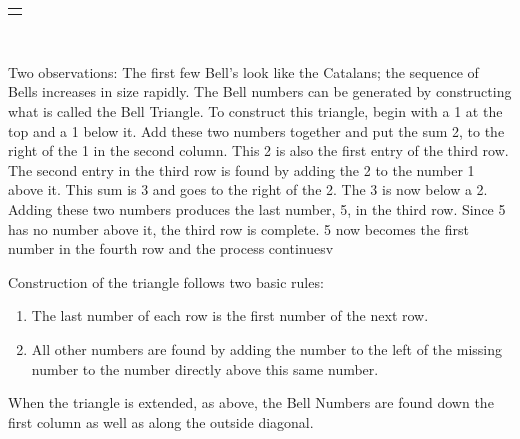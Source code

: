 \documentclass[10pt,]{book}
\theoremstyle{plain}
\theoremstyle{definition}
\theoremstyle{definition}
\numberwithin{equation}{chapter}
\newlength{\panelmax}
\begin{document}
\begin{assemblage}
{\settototalheight{\phAtabular}{\usebox{\panelboxAtabular}}
\setlength{\panelmax}{\maxof{\panelmax}{\phAtabular}}
\leavevmode%
\setlength{\tabcolsep}{0\linewidth}
\par\medskip\noindent
\hspace*{0.25\linewidth}%
\begin{tabular}{@{}*{1}{c}@{}}
\begin{minipage}[c][\panelmax][t]{0.5\linewidth}\usebox{\panelboxAtabular}\end{minipage}\end{tabular}\\
}%
\end{assemblage}
\hypertarget{p-154}{}%
Two observations: The first few Bell's look like the Catalans; the sequence of Bells increases in size rapidly. The Bell numbers can be generated by constructing what is called the Bell Triangle. To construct this triangle, begin with a 1 at the top and a 1 below it. Add these two numbers together and put the sum 2, to the right of the 1 in the second column. This 2 is also the first entry of the third row. The second entry in the third row is found by adding the 2 to the number 1 above it. This sum is 3 and goes to the right of the 2. The 3 is now below a 2. Adding these two numbers produces the last number, 5, in the third row. Since 5 has no number above it, the third row is complete. 5 now becomes the first number in the fourth row and the process continuesv%
\par
\hypertarget{p-155}{}%
Construction of the triangle follows two basic rules: \leavevmode%
\begin{enumerate}
\item\hypertarget{li-31}{}\hypertarget{p-156}{}%
The last number of each row is the first number of the next row.%
\item\hypertarget{li-32}{}\hypertarget{p-157}{}%
All other numbers are found by adding the number to the left of the missing number to the number directly above this same number.%
\end{enumerate}
 When the triangle is extended, as above, the Bell Numbers are found down the first column as well as along the outside diagonal.%
\end{document}
